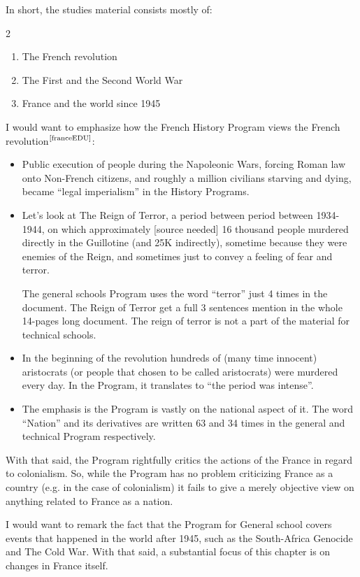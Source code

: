 \documentclass[12pt]{../../../tex/classes/styledArticle}
\newcommand\mc[1]  {$^{\text{\cite{#1}}}$}
\begin{document}
	In short, the studies material consists mostly of: 
	\begin{multicols}{2}
		\begin{enumerate}
			\item The French revolution
			\item The First and the Second World War
			\item France and the world since 1945
		\end{enumerate}
	\end{multicols}
	I would want to emphasize how the French History Program views the French revolution\mc{franceEDU}: 
	\begin{itemize}
		\item Public execution of people during the Napoleonic Wars, forcing Roman law onto Non-French citizens, and roughly a million civilians starving and dying, became ``legal imperialism'' in the History Programs. 
		\item Let's look at The Reign of Terror, a period between period between 1934-1944, on which approximately [source needed] 16 thousand people murdered directly in the Guillotine (and 25K indirectly), sometime because they were enemies of the Reign, and sometimes just to convey a feeling of fear and terror. 
		
		The general schools Program uses the word ``terror'' just 4 times in the document. The Reign of Terror get a full 3 sentences mention in the whole 14-pages long document. The reign of terror is not a part of the material for technical schools. 
		
		\item In the beginning of the revolution hundreds of (many time innocent) aristocrats (or people that chosen to be called aristocrats) were murdered every day. In the Program, it translates to ``the period was intense''. 
		\item The emphasis is the Program is vastly on the national aspect of it. The word ``Nation'' and its derivatives are written 63 and 34 times in the general and technical Program respectively. 
	\end{itemize}
	With that said, the Program rightfully critics the actions of the France in regard to colonialism. So, while the Program has no problem criticizing France as a country (e.g. in the case of colonialism) it fails to give a merely objective view on anything related to France as a nation. 
	
	I would want to remark the fact that the Program for General school covers events that happened in the world after 1945, such as the South-Africa Genocide and The Cold War. With that said, a substantial focus of this chapter is on changes in France itself. 
	
\end{document}
